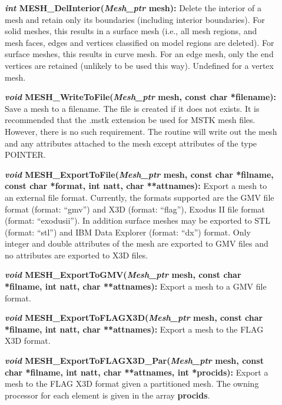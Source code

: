 \documentclass[12pt]{article}
\begin{document}
\begin{description}
\item[]{\bf {\em int} MESH\_DelInterior({\em Mesh\_ptr}
    mesh):} Delete the interior of a mesh and retain only its
    boundaries (including interior boundaries). For solid meshes, this
    results in a surface mesh (i.e., all mesh regions, and  mesh
    faces, edges and vertices classified on model regions are deleted). For
    surface meshes, this results in curve mesh. For an edge mesh, only
    the end vertices are retained (unlikely to be used this
    way). Undefined for a vertex mesh.
  
  \item[]{\bf {\em void} MESH\_WriteToFile({\em Mesh\_ptr} mesh, const
      char *filename):} Save a mesh to a filename. The file is created
    if it does not exists. It is recommended that the .mstk extension
    be used for MSTK mesh files.  However, there is no such
    requirement. The routine will write out the mesh and any
    attributes attached to the mesh except attributes of the type
    POINTER.
  
  \item[]{\bf {\em void} MESH\_ExportToFile({\em Mesh\_ptr} mesh,
      const char *filname, const char *format, int natt, char
      **attnames):} Export a mesh to an external file
    format. Currently, the formats supported are the GMV file format
    (format: ``gmv'') and X3D (format: ``flag''), Exodus II file
    format (format: ``exodusii''). In addition surface meshes may be
    exported to STL (format: ``stl'') and IBM Data Explorer (format:
    ``dx'') format. Only integer and double attributes of the mesh are
    exported to GMV files and no attributes are exported to X3D files.

  \item[]{\bf {\em void} MESH\_ExportToGMV({\em Mesh\_ptr} mesh, const
      char *filname, int natt, char **attnames):} Export a mesh to a
    GMV file format.

\item[]{\bf {\em void} MESH\_ExportToFLAGX3D({\em Mesh\_ptr} mesh,
    const char *filname, int natt, char **attnames):} Export a mesh to
  the FLAG X3D format.

\item[]{\bf {\em void} MESH\_ExportToFLAGX3D\_Par({\em Mesh\_ptr}
    mesh, const char *filname, int natt, char **attnames, int
    *procids):} Export a mesh to the FLAG X3D format given a
  partitioned mesh. The owning processor for each element is given in
  the array {\bf procids}.


\end{description}
\end{document}

